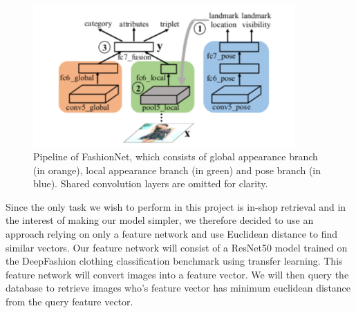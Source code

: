 \begin{figure}[H]
\includegraphics[width=10cm]{images/fashionnet-architecture.png} 
\centering
\caption{Pipeline of FashionNet, which consists of global appearance branch (in orange), local appearance branch (in green) and pose branch (in blue). Shared convolution layers are omitted for clarity. \cite{deepfashion}}
\label{architecture}
\end{figure}

Since the only task we wish to perform in this project is in-shop retrieval and in the interest of making our model simpler, we therefore decided to use an approach relying on only a feature network and use Euclidean distance to find similar vectors. Our feature network will consist of a ResNet50 model trained on the DeepFashion clothing classification benchmark using transfer learning. This feature network will convert images into a feature vector. We will then query the database to retrieve images who's feature vector has minimum euclidean distance from the query feature vector. 

